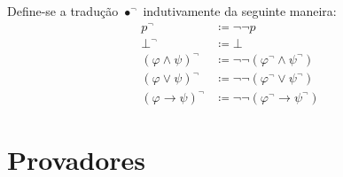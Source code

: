 \begin{definition}[$\bullet^\neg$] Define-se a tradução $\bullet^\neg$ indutivamente da seguinte maneira:
    \begin{align*}
        p^\neg                     & \coloneqq \neg\neg p                               \\
        \bot^\neg                  & \coloneqq \bot                                     \\
        (\varphi \wedge \psi)^\neg & \coloneqq \neg\neg (\varphi^\neg \wedge \psi^\neg) \\
        (\varphi \vee \psi)^\neg   & \coloneqq \neg\neg (\varphi^\neg \vee \psi^\neg)   \\
        (\varphi \to \psi)^\neg    & \coloneqq \neg\neg (\varphi^\neg \to \psi^\neg)
        \tag*{\qed} 
    \end{align*}
\end{definition}

\section{Provadores}
